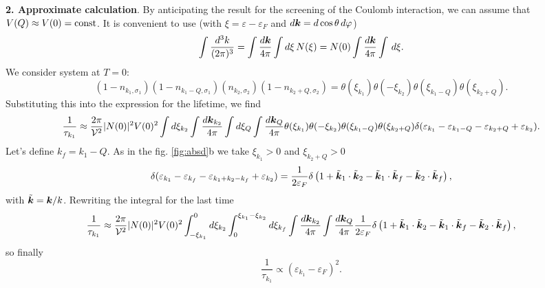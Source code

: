 



\textbf{2. Approximate calculation}. 
By anticipating the result for the screening of the Coulomb interaction, we can
assume that  $V(Q) \approx V(0) = \textnormal{const}$. It is convenient to use  (with $\xi = \varepsilon - \varepsilon_F$ and $d \boldsymbol{k} = d \cos \theta \, d \varphi$)
\begin{equation*}
	\int \frac{d^3 k}{(2\pi)^3} 
	= \int \frac{d \boldsymbol{k}}{4\pi} \int d\xi \, N(\xi)  
	=  N(0)\int \frac{d \boldsymbol{k}}{4\pi} \int \, d \xi
	.
\end{equation*}
We consider system at $T=0$:
\begin{equation*}
	(1- n_{k_1, \sigma_1})(1- n_{k_1-Q, \sigma_1}) (n_{k_2, \sigma_2})(1- n_{k_2+Q, \sigma_2}) = \theta(\xi_{k_1}) \theta(- \xi_{k_2}) \theta(\xi_{k_1-Q}) \theta(\xi_{k_2+Q}).
\end{equation*}
Substituting this into the expression for the lifetime, we find
\begin{equation*}
	\frac{1}{\tau_{k_1}} \approx \frac{2\pi}{\mathcal{V}^2} |N(0)|^2 V(0)^2
	\int d \xi_{k_2} 
	\int \frac{d \boldsymbol{k}_{k_2}}{4\pi} 
	\int d \xi_{Q} 
	\int \frac{d \boldsymbol{k}_{Q}}{4\pi} 
	\theta(\xi_{k_1}) \theta(- \xi_{k_2}) \theta(\xi_{k_1-Q}) \theta(\xi_{k_2+Q})
	\delta( \varepsilon_{k_1} - \varepsilon_{k_1-Q} - \varepsilon_{k_2+Q} + \varepsilon_{k_2}).
\end{equation*}
Let's define $k_f = k_1 - Q$. As in the fig. \ref{fig:absd}b we take $\xi_{k_1} > 0$ and $\xi_{k_2+Q} > 0$
\begin{equation*}
	\delta( \varepsilon_{k_1} - \varepsilon_{k_f} - \varepsilon_{k_1+k_2-k_f} + \varepsilon_{k_2}) = \frac{1}{2 \varepsilon_F} \delta\left(
		1 + \tilde{\boldsymbol{k}}_1 \cdot \tilde{\boldsymbol{k}}_2 - \tilde{\boldsymbol{k}}_1 \cdot \tilde{\boldsymbol{k}}_f - \tilde{\boldsymbol{k}}_2 \cdot \tilde{\boldsymbol{k}}_f
	\right),
\end{equation*}
with $\tilde{\boldsymbol{k}} = \boldsymbol{k} / k$. Rewriting the integral for the last time
\begin{equation*}
	\frac{1}{\tau_{k_1}} \approx  \frac{2\pi}{\mathcal{V}^2} |N(0)|^2 V(0)^2 \int_{-\xi_{k_1}}^{0} d \xi_{k_2} \int_{0}^{\xi_{k_1}-\xi_{k_2}} d \xi_{k_f} 
	\int \frac{d \boldsymbol{k}_{k_2}}{4\pi} \int \frac{d \boldsymbol{k}_{Q}}{4\pi} 
	\frac{1}{2 \varepsilon_F} \delta\left(
		1 + \tilde{\boldsymbol{k}}_1 \cdot \tilde{\boldsymbol{k}}_2 - \tilde{\boldsymbol{k}}_1 \cdot \tilde{\boldsymbol{k}}_f - \tilde{\boldsymbol{k}}_2 \cdot \tilde{\boldsymbol{k}}_f
	\right),
\end{equation*}
so finally
\begin{equation*}
	\frac{1}{\tau_{k_1}} \propto (\varepsilon_{k_1}-\varepsilon_F)^2.
\end{equation*}